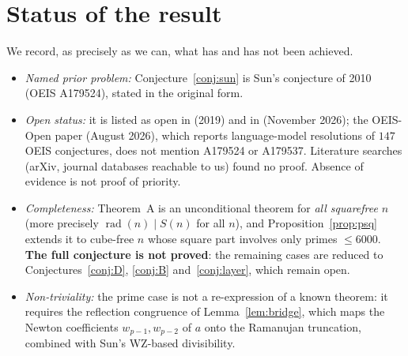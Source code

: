 \documentclass[11pt]{amsart}
\theoremstyle{definition}
\newcommand{\rad}{\operatorname{rad}}
\begin{document}
\section{Status of the result}\label{sec:status}
We record, as precisely as we can, what has and has not been achieved.
\begin{itemize}
\item \emph{Named prior problem:} Conjecture~\ref{conj:sun} is Sun's conjecture of 2010 (OEIS
A179524), stated in the original form.
\item \emph{Open status:} it is listed as open in \cite{SunOpen} (2019) and in \cite{FC}
(November 2026); the OEIS-Open paper \cite{OO} (August 2026), which reports language-model
resolutions of $147$ OEIS conjectures, does not mention A179524 or A179537. Literature searches (arXiv, journal databases reachable to us) found no proof.
Absence of evidence is not proof of priority.
\item \emph{Completeness:} Theorem~A is an unconditional theorem for \emph{all squarefree} $n$ (more
precisely $\rad(n)\mid S(n)$ for all $n$), and Proposition~\ref{prop:psq} extends it to cube-free $n$
whose square part involves only primes $\le6000$. \textbf{The full conjecture is not proved}: the
remaining cases are reduced to Conjectures~\ref{conj:D}, \ref{conj:B} and~\ref{conj:layer}, which
remain open.
\item \emph{Non-triviality:} the prime case is not a re-expression of a known theorem: it requires
the reflection congruence of Lemma~\ref{lem:bridge}, which maps the Newton coefficients
$w_{p-1},w_{p-2}$ of $a$ onto the Ramanujan truncation, combined with Sun's WZ-based divisibility.
\end{itemize}

\appendix
\end{document}
